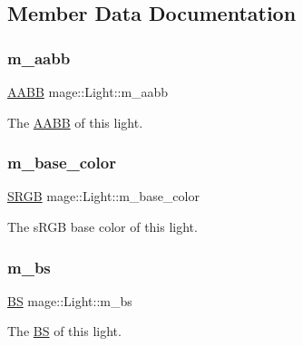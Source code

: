 \subsection{Member Data Documentation}
\hypertarget{classmage_1_1_light_a2c9190a763a1f37f7639a02bef01279d}{}\label{classmage_1_1_light_a2c9190a763a1f37f7639a02bef01279d} 
\subsubsection{\texorpdfstring{m\+\_\+aabb}{m\_aabb}}
{\footnotesize\ttfamily \hyperlink{structmage_1_1_a_a_b_b}{A\+A\+BB} mage\+::\+Light\+::m\+\_\+aabb\hspace{0.3cm}{\ttfamily [private]}}

The \hyperlink{structmage_1_1_a_a_b_b}{A\+A\+BB} of this light. \hypertarget{classmage_1_1_light_a31c237ed5716313d0c8916186bef4dab}{}\label{classmage_1_1_light_a31c237ed5716313d0c8916186bef4dab} 
\subsubsection{\texorpdfstring{m\+\_\+base\+\_\+color}{m\_base\_color}}
{\footnotesize\ttfamily \hyperlink{structmage_1_1_s_r_g_b}{S\+R\+GB} mage\+::\+Light\+::m\+\_\+base\+\_\+color\hspace{0.3cm}{\ttfamily [private]}}

The s\+R\+GB base color of this light. \hypertarget{classmage_1_1_light_a926df9e12442c630d252fae852b8fc57}{}\label{classmage_1_1_light_a926df9e12442c630d252fae852b8fc57} 
\subsubsection{\texorpdfstring{m\+\_\+bs}{m\_bs}}
{\footnotesize\ttfamily \hyperlink{structmage_1_1_b_s}{BS} mage\+::\+Light\+::m\+\_\+bs\hspace{0.3cm}{\ttfamily [private]}}

The \hyperlink{structmage_1_1_b_s}{BS} of this light. 